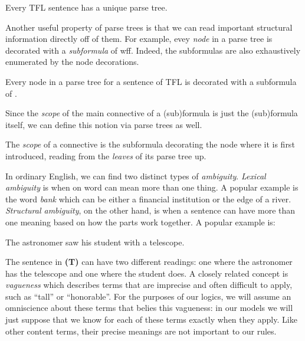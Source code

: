 \begin{observation}
  Every TFL sentence has a unique parse tree.
\end{observation}

Another useful property of parse trees is that we can read important structural
information directly off of them. For example, evey \emph{node} in a parse tree
is decorated with a \emph{subformula} of wff. Indeed, the subformulas are also
exhaustively enumerated by the node decorations.

\begin{observation}
  Every node in a parse tree for a sentence \sphi of TFL is decorated with a
  subformula of \ephi.
\end{observation}

Since the \emph{scope} of the main connective of a (sub)formula is just the
(sub)formula itself, we can define this notion via parse trees as well.

\begin{definition}
  The \emph{scope} of a connective is the subformula decorating the node where
  it is first introduced, reading from the \emph{leaves} of its parse tree up.
\end{definition}

In ordinary English, we can find two distinct types of \emph{ambiguity}.
\emph{Lexical ambiguity} is when on word can mean more than one thing. A popular
example is the word \emph{bank} which can be either a financial institution or
the edge of a river. \emph{Structural ambiguity}, on the other hand, is when a
sentence can have more than one meaning based on how the parts work together. A
popular example is:

\begin{argument}
\item[\textbf{(T)}] The astronomer saw his student with a telescope.
\end{argument}

The sentence in \textbf{(T)} can have two different readings: one where the
astronomer has the telescope and one where the student does. A closely related
concept is \emph{vagueness} which describes terms that are imprecise and often
difficult to apply, such as ``tall'' or ``honorable''. For the purposes of our
logics, we will assume an omniscience about these terms that belies this
vagueness: in our models we will just suppose that we know for each of these
terms exactly when they apply. Like other content terms, their precise meanings
are not important to our rules.

